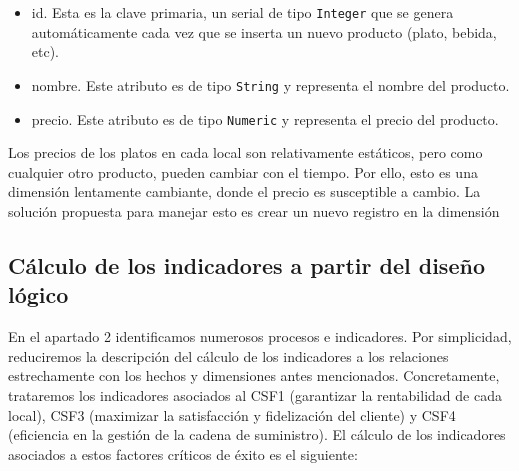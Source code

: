 \documentclass[12pt]{opticajnl}
\begin{document}
\begin{itemize}
\begin{itemize}
\item id. Esta es la clave primaria, un serial de tipo \texttt{Integer} que se genera automáticamente cada vez que se inserta un nuevo producto (plato, bebida, etc).
\item nombre. Este atributo es de tipo \texttt{String} y representa el nombre del producto.
\item precio. Este atributo es de tipo \texttt{Numeric} y representa el precio del producto.
\end{itemize}
Los precios de los platos en cada local son relativamente estáticos, pero como cualquier otro producto, pueden cambiar con el tiempo. Por ello, esto es una dimensión lentamente cambiante, donde el precio es susceptible a cambio. La solución propuesta para manejar esto es crear un nuevo registro en la dimensión
\end{itemize}


\subsection{Cálculo de los indicadores a partir del diseño lógico} \label{sec:3c}

En el apartado 2 identificamos numerosos procesos e indicadores. Por simplicidad, reduciremos la descripción del cálculo de los indicadores a los relaciones estrechamente con los hechos y dimensiones antes mencionados. Concretamente, trataremos los indicadores asociados al CSF1 (garantizar la rentabilidad de cada local), CSF3 (maximizar la satisfacción y fidelización del cliente) y CSF4 (eficiencia en la gestión de la cadena de suministro). El cálculo de los indicadores asociados a estos factores críticos de éxito es el siguiente:
\end{document}
